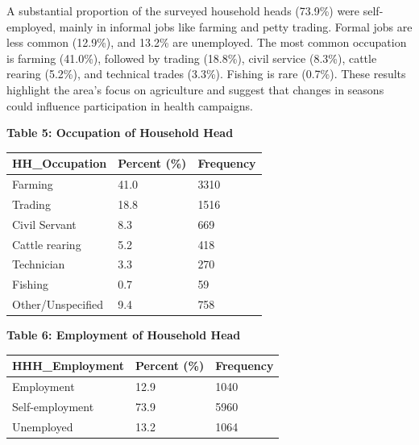 \documentclass[
  11pt,
]{report}
\begin{document}
A substantial proportion of the surveyed household heads (73.9\%) were
self-employed, mainly in informal jobs like farming and petty trading.
Formal jobs are less common (12.9\%), and 13.2\% are unemployed. The
most common occupation is farming (41.0\%), followed by trading
(18.8\%), civil service (8.3\%), cattle rearing (5.2\%), and technical
trades (3.3\%). Fishing is rare (0.7\%). These results highlight the
area's focus on agriculture and suggest that changes in seasons could
influence participation in health campaigns.

\textbf{Table 5: Occupation of Household Head}

\begin{longtable}[]{@{}lll@{}}
\toprule\noalign{}
HH\_Occupation & Percent (\%) & Frequency \\
\midrule\noalign{}
\endhead
\bottomrule\noalign{}
\endlastfoot
Farming & 41.0 & 3310 \\
Trading & 18.8 & 1516 \\
Civil Servant & 8.3 & 669 \\
Cattle rearing & 5.2 & 418 \\
Technician & 3.3 & 270 \\
Fishing & 0.7 & 59 \\
Other/Unspecified & 9.4 & 758 \\
\end{longtable}

\textbf{Table 6: Employment of Household Head}

\begin{longtable}[]{@{}lll@{}}
\toprule\noalign{}
HHH\_Employment & Percent (\%) & Frequency \\
\midrule\noalign{}
\endhead
\bottomrule\noalign{}
\endlastfoot
Employment & 12.9 & 1040 \\
Self-employment & 73.9 & 5960 \\
Unemployed & 13.2 & 1064 \\
\end{longtable}
\end{document}
